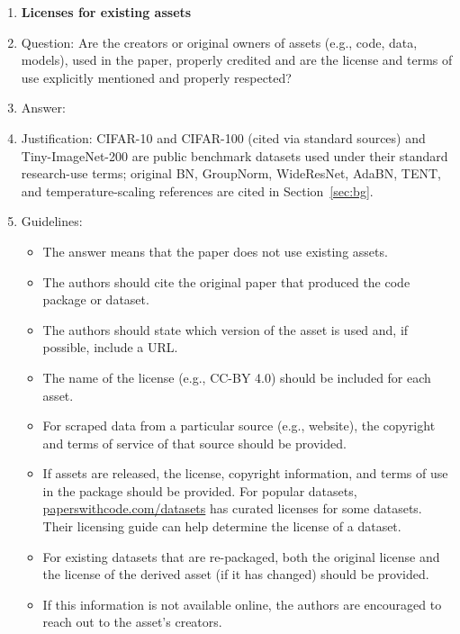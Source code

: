 \documentclass{article}
\begin{document}
\begin{enumerate}
\item {\bf Licenses for existing assets}
    \item[] Question: Are the creators or original owners of assets (e.g., code, data, models), used in the paper, properly credited and are the license and terms of use explicitly mentioned and properly respected?
    \item[] Answer: \answerYes{}
    \item[] Justification: CIFAR-10 and CIFAR-100 \citep{ioffe2015batch} (cited via standard sources) and Tiny-ImageNet-200 are public benchmark datasets used under their standard research-use terms; original BN, GroupNorm, WideResNet, AdaBN, TENT, and temperature-scaling references are cited in Section~\ref{sec:bg}.
    \item[] Guidelines:
    \begin{itemize}
        \item The answer \answerNA{} means that the paper does not use existing assets.
        \item The authors should cite the original paper that produced the code package or dataset.
        \item The authors should state which version of the asset is used and, if possible, include a URL.
        \item The name of the license (e.g., CC-BY 4.0) should be included for each asset.
        \item For scraped data from a particular source (e.g., website), the copyright and terms of service of that source should be provided.
        \item If assets are released, the license, copyright information, and terms of use in the package should be provided. For popular datasets, \url{paperswithcode.com/datasets} has curated licenses for some datasets. Their licensing guide can help determine the license of a dataset.
        \item For existing datasets that are re-packaged, both the original license and the license of the derived asset (if it has changed) should be provided.
        \item If this information is not available online, the authors are encouraged to reach out to the asset's creators.
    \end{itemize}


\end{enumerate}
\end{document}
